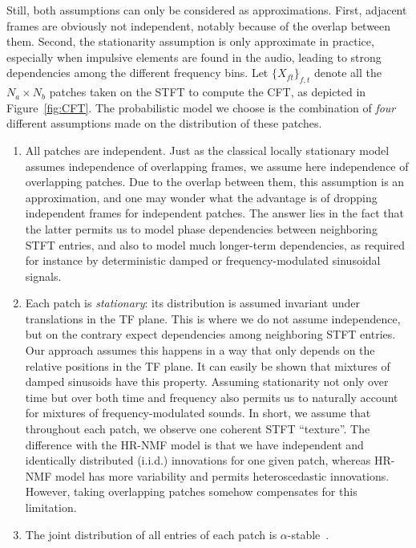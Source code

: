 Still, both assumptions can only be considered as approximations.
First, adjacent frames are obviously not independent, notably because
of the overlap between them. Second, the stationarity assumption is
only approximate in practice, especially when impulsive elements are
found in the audio, leading to strong dependencies among the different
frequency bins. Let $\{ X_{ft}\} _{f,t}$
denote all the $N_{a}\times N_{b}$ patches taken on the STFT to compute
the CFT, as depicted in Figure~\ref{fig:CFT}. The probabilistic
model we choose is the combination of \emph{four} different assumptions
made on the distribution of these patches.

\begin{enumerate}[leftmargin=0cm,itemindent=.5cm,labelwidth=\itemindent,labelsep=0cm,align=left]
\item All patches are independent. Just as the classical locally stationary
model~\cite{liutkus11t} assumes independence of overlapping frames,
we assume here independence of overlapping patches. Due to the
overlap between them, this assumption is an approximation,
and one may wonder what the advantage is of dropping independent frames
for independent patches. The answer lies in the fact that the latter
permits us to model phase dependencies between neighboring STFT entries,
and also to model much longer-term dependencies, as required for instance
by deterministic damped or frequency-modulated sinusoidal signals.\label{enu:assumption_independent_patches}
\item Each patch is \emph{stationary}: its distribution
is assumed invariant under translations in the TF plane. This is where we do not assume independence, but on the contrary expect dependencies among neighboring STFT entries. Our approach assumes this happens in a way that only depends on the relative positions in
the TF plane. It can easily be shown that mixtures of
damped sinusoids have this property. Assuming stationarity not only over time but over both time and frequency
also permits us to naturally account for mixtures of frequency-modulated
sounds. In short, we assume that throughout each patch, we observe
one coherent STFT ``texture''. The difference with the HR-NMF model is that we have independent and identically
distributed (i.i.d.) innovations for one given patch, whereas HR-NMF model has more variability and permits heteroscedastic innovations. However, taking overlapping patches somehow compensates for
this limitation.\label{enu:assumption_stationary}
\item The joint distribution of all entries of each patch is $\alpha$-stable~\cite{samoradnitsky94}.

\end{enumerate}

